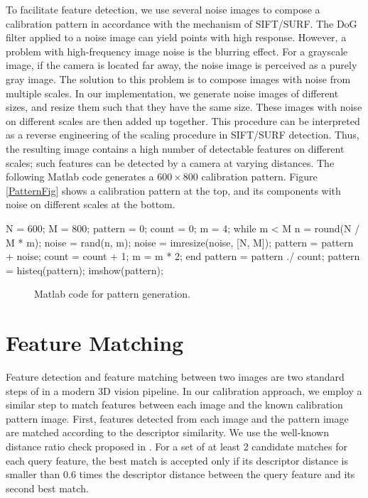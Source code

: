 \documentclass{report}
\begin{document}
To facilitate feature detection, we use several noise images to compose a calibration pattern in accordance with the mechanism of SIFT/SURF. The DoG filter applied to a noise image can yield points with high response. However, a problem with high-frequency image noise is the blurring effect. For a grayscale image, if the camera is located far away, the noise image is perceived as a purely gray image. The solution to this problem is to compose images with noise from multiple scales. In our implementation, we generate noise images of different sizes, and resize them such that they have the same size. These images with noise on different scales are then added up together. This procedure can be interpreted as a reverse engineering of the scaling procedure in SIFT/SURF detection. Thus, the resulting image contains a high number of detectable features on different scales; such features can be detected by a camera at varying distances. The following Matlab code generates a $600 \times 800$ calibration pattern. Figure \ref{PatternFig} shows a calibration pattern at the top, and its components with noise on different scales at the bottom. 

\small
\begin{verbbox}
N = 600; M = 800;
pattern = 0; count = 0;
m = 4;
while m < M
  n = round(N / M * m);
  noise = rand(n, m);
  noise = imresize(noise, [N, M]);
  pattern = pattern + noise;
  count = count + 1;
  m = m * 2;
end
pattern = pattern ./ count;
pattern = histeq(pattern);
imshow(pattern);
\end{verbbox}
\normalsize

\begin{figure}
  \centering
  \theverbbox
  \caption{Matlab code for pattern generation.}
\end{figure}


\section{Feature Matching}
Feature detection and feature matching between two images are two standard steps of in a modern 3D vision pipeline. In our calibration approach, we employ a similar step to match features between each image and the known calibration pattern image. First, features detected from each image and the pattern image are matched according to the descriptor similarity. We use the well-known distance ratio check proposed in \cite{lowe2004distinctive}. For a set of at least 2 candidate matches for each query feature, the best match is accepted only if its descriptor distance is smaller than 0.6 times the descriptor distance between the query feature and its second best match. 
\end{document}
